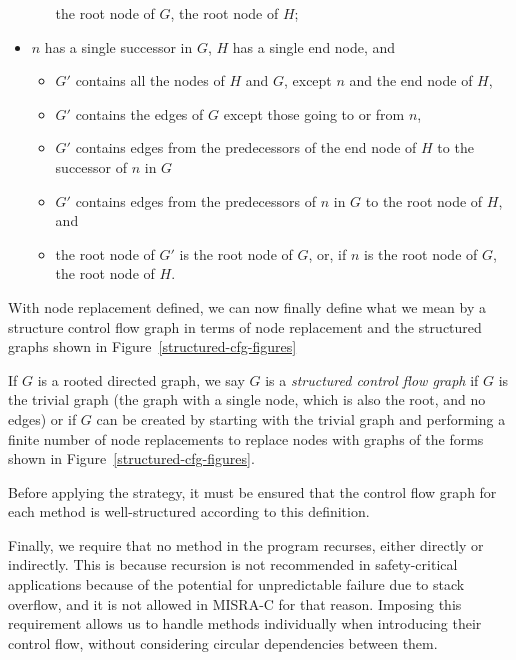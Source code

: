 \begin{defn}
\begin{itemize}
\begin{itemize}
      the root node of $G$, the root node of $H$;
    \end{itemize}
  \item $n$ has a single successor in $G$, $H$ has a single end
    node, and
    \begin{itemize}
    \item $G'$ contains all the nodes of $H$ and $G$, except $n$ and
      the end node of $H$,
    \item $G'$ contains the edges of $G$ except those going to or from
      $n$,
    \item $G'$ contains edges from the predecessors of the end node of
      $H$ to the successor of $n$ in $G$
    \item $G'$ contains edges from the predecessors of $n$ in $G$ to
      the root node of $H$, and
    \item the root node of $G'$ is the root node of $G$, or, if $n$ is
      the root node of $G$, the root node of $H$.
    \end{itemize}
  \end{itemize}
\end{defn}

With node replacement defined, we can now finally define what we mean
by a structure control flow graph in terms of node replacement and the
structured graphs shown in Figure~\ref{structured-cfg-figures}

\begin{defn}
  If $G$ is a rooted directed graph, we say $G$ is a \emph{structured
    control flow graph} if $G$ is the trivial graph (the graph with a
  single node, which is also the root, and no edges) or if $G$ can be
  created by starting with the trivial graph and performing a finite
  number of node replacements to replace nodes with graphs of the
  forms shown in Figure~\ref{structured-cfg-figures}.
\end{defn}

Before applying the strategy, it must be ensured that the control flow
graph for each method is well-structured according to this definition.

Finally, we require that no method in the program recurses, either
directly or indirectly.
This is because recursion is not recommended in safety-critical
applications because of the potential for unpredictable failure due to
stack overflow, and it is not allowed in MISRA-C for that reason.
Imposing this requirement allows us to handle methods individually
when introducing their control flow, without considering circular
dependencies between them.



